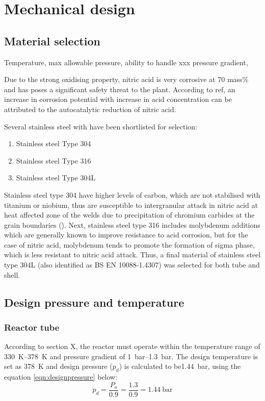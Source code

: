 \section{Mechanical design}
\subsection{Material selection}
Temperature, max allowable pressure, ability to handle xxx pressure gradient, 

Due to the strong oxidising property, nitric acid is very corrosive at 70 mass\% and has poses a significant safety threat to the plant. According to ref, an increase in corrosion potential with increase in acid concentration can be attributed to the autocatalytic reduction of nitric acid. 

Several stainless steel with have been shortlisted for selection: 
\begin{enumerate}
    \item Stainless steel Type 304
    \item Stainless steel Type 316
    \item Stainless steel Type 304L
\end{enumerate}

Stainless steel type 304 have higher levels of carbon, which are not stabilised with titanium or niobium, thus are susceptible to intergranular attack in nitric acid at heat affected zone of the welds due to precipitation of chromium carbides at the grain boundaries (). Next, stainless steel type 316 includes molybdenum additions which are generally known to improve resistance to acid corrosion, but for the case of nitric acid, molybdenum tends to promote the formation of sigma phase, which is less resistant to nitric acid attack. Thus, a final material of stainless steel type 304L (also identified as BS EN 10088-1.4307) was selected for both tube and shell.

\subsection{Design pressure and temperature}
\subsubsection{Reactor tube}
According to section X, the reactor must operate within the temperature range of \SIrange{330}{378}{\K} and pressure gradient of \SIrange{1}{1.3}{\bar}. The design temperature is set as \SI{378}{\K} and design pressure ($p_d$) is calculated to be\SI{1.44}{\bar}, using the equation \ref{eqn:designpressure} below:
\begin{equation}
    p_d = \frac{P_o}{0.9} = \frac{1.3}{0.9} = \SI{1.44}{\bar}
    \label{eqn:designpressure}
\end{equation}
